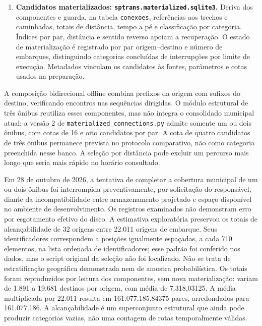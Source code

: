 \begin{enumerate}
\item \textbf{Candidatos materializados: \nolinkurl{sptrans.materialized.sqlite3}.} Deriva dos componentes e guarda, na tabela \nolinkurl{conexoes}, referências aos trechos e caminhadas, totais de distância, tempo a pé e classificação por categoria. Índices por par, distância e sentido reverso apoiam a recuperação. O estado de materialização é registrado por par origem--destino e número de embarques, distinguindo categorias concluídas de interrupções por limite de execução. Metadados vinculam os candidatos às fontes, parâmetros e cotas usados na preparação.
\end{enumerate}

A composição bidirecional offline combina prefixos da origem com sufixos do destino, verificando encontros nas sequências dirigidas. O módulo estrutural de três ônibus reutiliza esses componentes, mas não integra o consolidado municipal atual: a versão 2 de \nolinkurl{materialized_connections.py} admite somente um ou dois ônibus, com cotas de 16 e oito candidatos por par. A cota de quatro candidatos de três ônibus permanece prevista no protocolo comparativo, não como categoria preenchida nesse banco. A seleção por distância pode excluir um percurso mais longo que seria mais rápido no horário consultado.

Em 28 de outubro de 2026, a tentativa de completar a cobertura municipal de um ou dois ônibus foi interrompida preventivamente, por solicitação do responsável, diante da incompatibilidade entre armazenamento projetado e espaço disponível no ambiente de desenvolvimento. Os registros examinados não demonstram erro por esgotamento efetivo do disco. A estimativa exploratória preservou os totais de alcançabilidade de 32 origens entre 22.011 origens de embarque. Seus identificadores correspondem a posições igualmente espaçadas, a cada 710 elementos, na lista ordenada de identificadores; esse padrão foi conferido nos dados, mas o script original da seleção não foi localizado. Não se trata de estratificação geográfica demonstrada nem de amostra probabilística. Os totais foram reproduzidos por leitura dos componentes, sem nova materialização: variam de 1.891 a 19.681 destinos por origem, com média de 7.318,03125. A média multiplicada por 22.011 resulta em 161.077.185,84375 pares, arredondados para 161.077.186. A alcançabilidade é um superconjunto estrutural que ainda pode produzir categorias vazias, não uma contagem de rotas temporalmente válidas.

